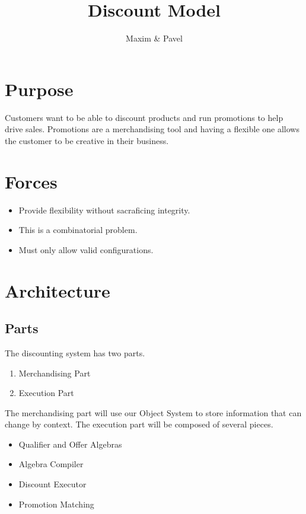 \documentclass[11pt]{article}
\title{Discount Model}
\author{Maxim \& Pavel}
\begin{document}
\maketitle
\section{Purpose}

Customers want to be able to discount products and run promotions to help drive
sales. Promotions are a merchandising tool and having a flexible one allows the
customer to be creative in their business.

\section{Forces}

\begin{itemize}
    \item Provide flexibility without sacraficing integrity. 
    \item This is a combinatorial problem.
    \item Must only allow valid configurations.
\end{itemize}

\section{Architecture}

\subsection{Parts}
The discounting system has two parts. 

\begin{enumerate}
    \item Merchandising Part
    \item Execution Part
\end{enumerate}

The merchandising part will use our Object System to store information that can
change by context. The execution part will be composed of several pieces.

\begin{itemize}
    \item Qualifier and Offer Algebras
    \item Algebra Compiler
    \item Discount Executor
    \item Promotion Matching
\end{itemize}
\end{document}
